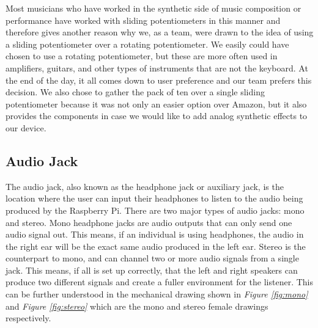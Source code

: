 Most musicians who have worked in the synthetic side of music composition or performance have worked with sliding potentiometers in this manner and therefore gives another reason why we, as a team, were drawn to the idea of using a sliding potentiometer over a rotating potentiometer. We easily could have chosen to use a rotating potentiometer, but these are more often used in amplifiers, guitars, and other types of instruments that are not the keyboard. At the end of the day, it all comes down to user preference and our team prefers this decision. We also chose to gather the pack of ten over a single sliding potentiometer because it was not only an easier option over Amazon, but it also provides the components in case we would like to add analog synthetic effects to our device.

\subsection{Audio Jack}

The audio jack, also known as the headphone jack or auxiliary jack, is the location where the user can input their headphones to listen to the audio being produced by the Raspberry Pi. There are two major types of audio jacks: mono and stereo. Mono headphone jacks are audio outputs that can only send one audio signal out. This means, if an individual is using headphones, the audio in the right ear will be the exact same audio produced in the left ear. Stereo is the counterpart to mono, and can channel two or more audio signals from a single jack. This means, if all is set up correctly, that the left and right speakers can produce two different signals and create a fuller environment for the listener. This can be further understood in the mechanical drawing shown in \textit{Figure \ref{fig:mono}} and \textit{Figure \ref{fig:stereo}} which are the mono and stereo female drawings respectively.

